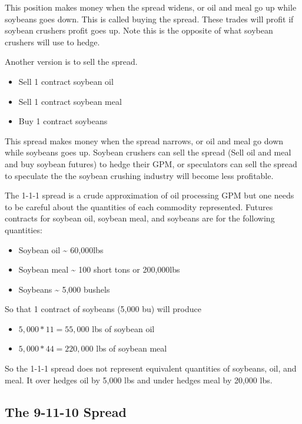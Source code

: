 \documentclass[
  letterpaper,
  DIV=11,
  numbers=noendperiod]{scrreprt}
\providecommand{\tightlist}{%
  \setlength{\itemsep}{0pt}\setlength{\parskip}{0pt}}\usepackage{longtable,booktabs,array}
\begin{document}
This position makes money when the spread widens, or oil and meal go up
while soybeans goes down. This is called buying the spread. These trades
will profit if soybean crushers profit goes up. Note this is the
opposite of what soybean crushers will use to hedge.

Another version is to sell the spread.

\begin{itemize}
\tightlist
\item
  Sell 1 contract soybean oil
\item
  Sell 1 contract soybean meal
\item
  Buy 1 contract soybeans
\end{itemize}

This spread makes money when the spread narrows, or oil and meal go down
while soybeans goes up. Soybean crushers can sell the spread (Sell oil
and meal and buy soybean futures) to hedge their GPM, or speculators can
sell the spread to speculate the the soybean crushing industry will
become less profitable.

The 1-1-1 spread is a crude approximation of oil processing GPM but one
needs to be careful about the quantities of each commodity represented.
Futures contracts for soybean oil, soybean meal, and soybeans are for
the following quantities:

\begin{itemize}
\tightlist
\item
  Soybean oil \textasciitilde{} 60,000lbs
\item
  Soybean meal \textasciitilde{} 100 short tons or 200,000lbs
\item
  Soybeans \textasciitilde{} 5,000 bushels
\end{itemize}

So that 1 contract of soybeans (5,000 bu) will produce

\begin{itemize}
\tightlist
\item
  \(5,000*11 = 55,000\) lbs of soybean oil
\item
  \(5,000*44 = 220,000\) lbs of soybean meal
\end{itemize}

So the 1-1-1 spread does not represent equivalent quantities of
soybeans, oil, and meal. It over hedges oil by 5,000 lbs and under
hedges meal by 20,000 lbs.

\hypertarget{the-9-11-10-spread}{%
\subsection{The 9-11-10 Spread}\label{the-9-11-10-spread}}
\end{document}
